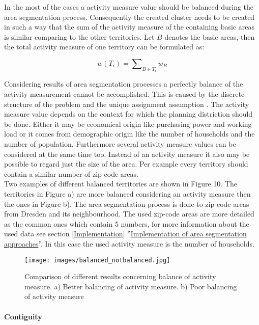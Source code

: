 In the most of the cases a activity measure value should be balanced during the area segmentation process. Consequently the created cluster needs to be created in such a way that the sum of the activity measure of the containing basic areas is similar comparing to the other territories. Let $ B $ denotes the basic areas, then the total activity measure of one territory can be formulated as:

\[ \mathit{w(T_{i}) = \sum\nolimits  _{B \in T_{i}} w_{B}}\]

Considering results of area segmentation processes a perfectly balance of the activity measurement cannot be accomplished. This is caused by the discrete structure of the problem and the unique assignment assumption \cite{kalcsics}. The activity measure value depends on the context for which the planning distriction should be done. Either it may be economical origin like purchasing power and working load or it comes from demographic origin like the number of households and the number of population. Furthermore several activity measure values can be considered at the same time too. Instead of an activity measure it also may be possible to regard just the size of the area. Per example every territory should contain a similar number of zip-code areas.\\
Two examples of different balanced territories are shown in Figure 10. The territories in Figure a) are more balanced considering an activity measure then the ones in Figure b). The area segmentation process is done to zip-code areas from Dresden and its neighbourhood. The used zip-code areas are more detailed as the common ones which contain 5 numbers, for more information about the used data see section \ref{Implementation} ''\hyperref[Implementation]{Implementation of area segmentation approaches}''. In this case the used activity measure is the number of households.

\begin{figure}[H]
	\centering
	\texttt{[image: images/balanced\_notbalanced.jpg]}
	\caption[Comparison of different results concerning balance of activity measure. ]{Comparison of different results concerning balance of activity measure. a) Better balancing of activity measure. b) Poor balancing of activity measure}
\end{figure}


\paragraph{Contiguity}\mbox{} \\

